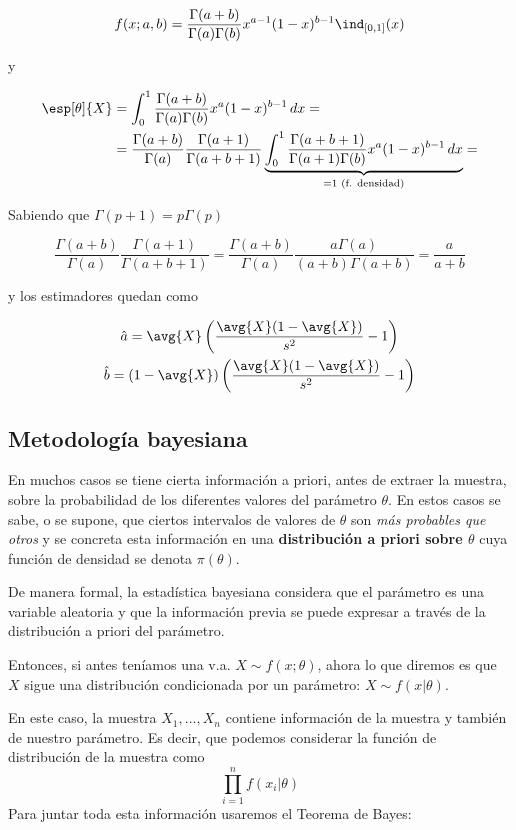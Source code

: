 \documentclass{apuntes}
\begin{document}
\[ f(x;a,b) = \frac{\Gamma(a+b)}{\Gamma(a)\Gamma(b)} x^{a-1}(1-x)^{b-1} \ind_{[0,1]}(x) \]

y

\begin{align*}
\esp[\theta]{X} &= \int_0^1\frac{\Gamma(a+b)}{\Gamma(a)\Gamma(b)} x^{a}(1-x)^{b-1}\,dx = \\
&= \frac{\Gamma(a+b)}{\Gamma(a)}\frac{\Gamma(a+1)}{\Gamma(a+b+1)}\underbrace{\int_0^1\frac{\Gamma(a+b+1)}{\Gamma(a+1)\Gamma(b)} x^{a}(1-x)^{b-1}\,dx}_{=1 \text{ (f. densidad)}} =
\end{align*}

Sabiendo que $\Gamma(p+1) = p\Gamma(p)$

\[ \frac{\Gamma(a+b)}{\Gamma(a)}\frac{\Gamma(a+1)}{\Gamma(a+b+1)} =
	\frac{\Gamma(a+b)}{\Gamma(a)}\frac{a\Gamma(a)}{(a+b)\Gamma(a+b)} = \frac{a}{a+b} \]

y los estimadores quedan como

\begin{gather*}
\hat{a} = \avg{X}\left(\frac{\avg{X}(1-\avg{X})}{s^2}-1\right) \\
\hat{b} = (1-\avg{X})\left(\frac{\avg{X}(1-\avg{X})}{s^2}-1\right)
\end{gather*}

\subsection{Metodología bayesiana}

En muchos casos se tiene cierta información a priori, antes de extraer la muestra, sobre la probabilidad de los diferentes valores del parámetro $\theta$. En estos casos se sabe, o se supone, que ciertos intervalos de valores de $\theta$ son \textit{más probables que otros} y se concreta esta información en una \textbf{distribución a priori sobre $\theta$} cuya función de densidad se denota $\pi(\theta)$.

De manera formal, la estadística bayesiana considera que el parámetro es una variable aleatoria y que la información previa se puede expresar a través de la distribución a priori del parámetro.

Entonces, si antes teníamos una v.a. $X\sim f(x;\theta)$, ahora lo que diremos es que $X$ sigue una distribución condicionada por un parámetro: $X\sim f(x|\theta)$.

En este caso, la muestra $X_1,\dotsc,X_n$ contiene información de la muestra y también de nuestro parámetro. Es decir, que podemos considerar la función de distribución de la muestra como \[ \prod_{i=1}^n f(x_i|\theta) \] Para juntar toda esta información usaremos el Teorema de Bayes:
\end{document}
